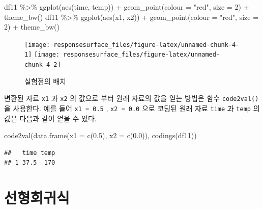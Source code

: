 \documentclass[
]{book}
\newenvironment{Shaded}{\begin{snugshade}}{\end{snugshade}}
\newcommand{\AttributeTok}[1]{\textcolor[rgb]{0.77,0.63,0.00}{#1}}
\newcommand{\DecValTok}[1]{\textcolor[rgb]{0.00,0.00,0.81}{#1}}
\newcommand{\FloatTok}[1]{\textcolor[rgb]{0.00,0.00,0.81}{#1}}
\newcommand{\FunctionTok}[1]{\textcolor[rgb]{0.00,0.00,0.00}{#1}}
\newcommand{\NormalTok}[1]{#1}
\newcommand{\SpecialCharTok}[1]{\textcolor[rgb]{0.00,0.00,0.00}{#1}}
\newcommand{\StringTok}[1]{\textcolor[rgb]{0.31,0.60,0.02}{#1}}
\theoremstyle{definition}
\theoremstyle{definition}
\theoremstyle{definition}
\theoremstyle{definition}
\theoremstyle{remark}
\begin{document}
\begin{Shaded}
\begin{Highlighting}[]
\NormalTok{df11 }\SpecialCharTok{\%\textgreater{}\%} \FunctionTok{ggplot}\NormalTok{(}\FunctionTok{aes}\NormalTok{(time, temp)) }\SpecialCharTok{+} \FunctionTok{geom\_point}\NormalTok{(}\AttributeTok{colour =} \StringTok{"red"}\NormalTok{, }\AttributeTok{size =} \DecValTok{2}\NormalTok{)  }\SpecialCharTok{+} \FunctionTok{theme\_bw}\NormalTok{()}
\NormalTok{df11 }\SpecialCharTok{\%\textgreater{}\%} \FunctionTok{ggplot}\NormalTok{(}\FunctionTok{aes}\NormalTok{(x1, x2)) }\SpecialCharTok{+} \FunctionTok{geom\_point}\NormalTok{(}\AttributeTok{colour =} \StringTok{"red"}\NormalTok{, }\AttributeTok{size =} \DecValTok{2}\NormalTok{)  }\SpecialCharTok{+} \FunctionTok{theme\_bw}\NormalTok{()}
\end{Highlighting}
\end{Shaded}

\begin{figure}

{\centering \texttt{[image: responsesurface\_files/figure-latex/unnamed-chunk-4-1]} \texttt{[image: responsesurface\_files/figure-latex/unnamed-chunk-4-2]} 

}

\caption{실험점의 배치}\label{fig:unnamed-chunk-4}
\end{figure}

변환된 자료 \texttt{x1} 과 \texttt{x2} 의 값으로 부터 원래 자료의 값을 얻는 방법은 함수 \texttt{code2val()}을 사용한다. 예를 들어
\texttt{x1\ =\ 0.5} , \texttt{x2\ =\ 0.0} 으로 코딩된 원래 자료 \texttt{time} 과 \texttt{temp} 의 값은 다음과 같이 얻을 수 있다.

\begin{Shaded}
\begin{Highlighting}[]
\FunctionTok{code2val}\NormalTok{(}\FunctionTok{data.frame}\NormalTok{(}\AttributeTok{x1 =} \FunctionTok{c}\NormalTok{(}\FloatTok{0.5}\NormalTok{), }\AttributeTok{x2 =} \FunctionTok{c}\NormalTok{(}\FloatTok{0.0}\NormalTok{)), }\FunctionTok{codings}\NormalTok{(df11))}
\end{Highlighting}
\end{Shaded}

\begin{verbatim}
##   time temp
## 1 37.5  170
\end{verbatim}

\hypertarget{uxc120uxd615uxd68cuxadc0uxc2dd}{%
\section{선형회귀식}\label{uxc120uxd615uxd68cuxadc0uxc2dd}}
\end{document}
